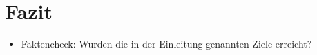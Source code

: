 \chapter{Fazit}

\begin{itemize}
    \item Faktencheck: Wurden die in der Einleitung genannten Ziele erreicht?
\end{itemize}
